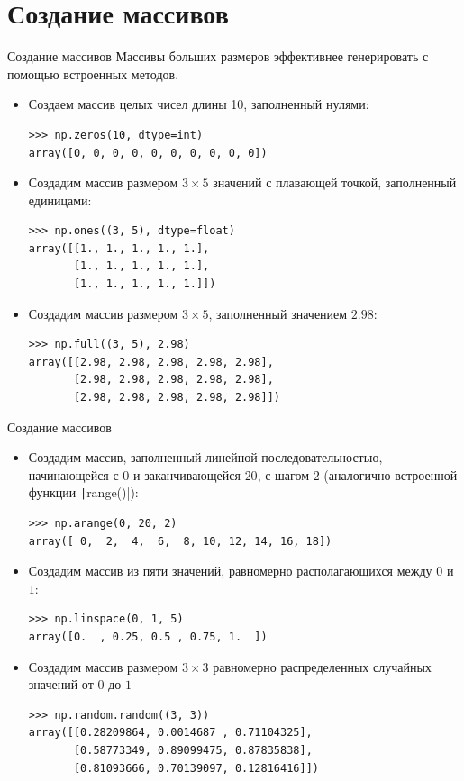 \documentclass[aspectratio=169, mathserif]{beamer}%
\begin{document}
\section{Создание массивов}
\begin{frame}[fragile]{Создание массивов}
\scriptsize
Массивы больших размеров эффективнее генерировать с помощью встроенных методов.
\begin{itemize}
\item Создаем массив целых чисел длины 10, заполненный нулями:
\begin{verbatim}
>>> np.zeros(10, dtype=int)
array([0, 0, 0, 0, 0, 0, 0, 0, 0, 0])
\end{verbatim}
\item Создадим массив размером $3 \times 5$ значений с плавающей точкой, заполненный единицами:
\begin{verbatim}
>>> np.ones((3, 5), dtype=float)
array([[1., 1., 1., 1., 1.],
       [1., 1., 1., 1., 1.],
       [1., 1., 1., 1., 1.]])
\end{verbatim}
\item Создадим массив размером $3 \times 5$, заполненный значением $2.98$:
\begin{verbatim}
>>> np.full((3, 5), 2.98)
array([[2.98, 2.98, 2.98, 2.98, 2.98],
       [2.98, 2.98, 2.98, 2.98, 2.98],
       [2.98, 2.98, 2.98, 2.98, 2.98]])
\end{verbatim}
\end{itemize}
\vfill
\end{frame}

\begin{frame}[fragile]{Создание массивов}
\scriptsize
\begin{itemize}
\item Создадим массив, заполненный линейной последовательностью, начинающейся с $0$ и заканчивающейся $20$, с шагом $2$ (аналогично встроенной функции \texttt|range()|):
\begin{verbatim}
>>> np.arange(0, 20, 2)
array([ 0,  2,  4,  6,  8, 10, 12, 14, 16, 18])
\end{verbatim}
\item Создадим массив из пяти значений, равномерно располагающихся между $0$ и $1$:
\begin{verbatim}
>>> np.linspace(0, 1, 5)
array([0.  , 0.25, 0.5 , 0.75, 1.  ])
\end{verbatim}
\item Создадим массив размером $3 \times 3$ равномерно распределенных случайных значений от $0$ до $1$
\begin{verbatim}
>>> np.random.random((3, 3))
array([[0.28209864, 0.0014687 , 0.71104325],
       [0.58773349, 0.89099475, 0.87835838],
       [0.81093666, 0.70139097, 0.12816416]])
\end{verbatim}
\end{itemize}
\end{frame}
\end{document}
